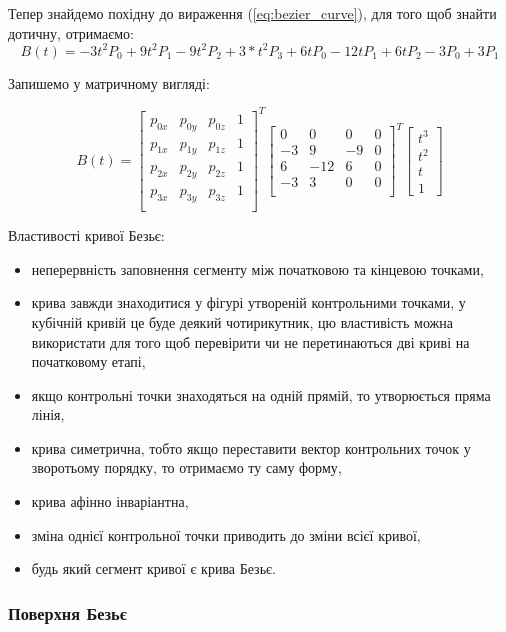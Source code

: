 \let\mypdfximage\pdfximage\def\pdfximage{\immediate\mypdfximage}\documentclass[14pt,a4paper]{extarticle}
\theoremstyle{definition}
\renewcommand{\[}{\begin{singlespace}\begin{equation*}}
\renewcommand{\]}{\end{equation*}\end{singlespace}}
\renewcommand{\+}{\discretionary{\mbox{\scriptsize$\hookleftarrow$}}{}{}}
\begin{document}
Тепер знайдемо похідну до вираження (\ref{eq:bezier_curve}), для того щоб знайти дотичну, отримаємо:
\begin{equation}
B(t) = -3t^2P_0+9t^2P_1-9t^2P_2+3*t^2P_3 + 6tP_0-12tP_1+6tP_2 - 3P_0+3P_1
\end{equation}

Запишемо у матричному вигляді:
\[B(t)=\left[\begin{matrix}
p_{0x} & p_{0y} & p_{0z} & 1 \\
p_{1x} & p_{1y} & p_{1z} & 1 \\
p_{2x} & p_{2y} & p_{2z} & 1 \\
p_{3x} & p_{3y} & p_{3z} & 1 \\
\end{matrix}\right]^T\left[\begin{matrix}
 0 &   0 &  0 & 0 \\
-3 &   9 & -9 & 0 \\
 6 & -12 &  6 & 0 \\
-3 &   3 &  0 & 0 \\
\end{matrix}\right]^T\left[\begin{matrix}t^3\\t^2\\t\\1\end{matrix}\right]\]

Властивості кривої Безьє:
\begin{itemize}
\item неперервність заповнення сегменту між початковою та кінцевою точками,
\item крива завжди знаходитися у фігурі утвореній контрольними точками, у кубічній кривій це буде деякий чотирикутник, цю властивість можна використати для того щоб перевірити чи не перетинаються дві криві на початковому етапі,
\item якщо контрольні точки знаходяться на одній прямій, то утворюється пряма лінія,
\item крива симетрична, тобто якщо переставити вектор контрольних точок у зворотьому порядку, то отримаємо ту саму форму,
\item крива афінно інваріантна,
\item зміна однієї контрольної точки приводить до зміни всієї кривої,
\item будь який сегмент кривої є крива Безьє.
\end{itemize}

\subsubsection{Поверхня Безьє}
\end{document}
